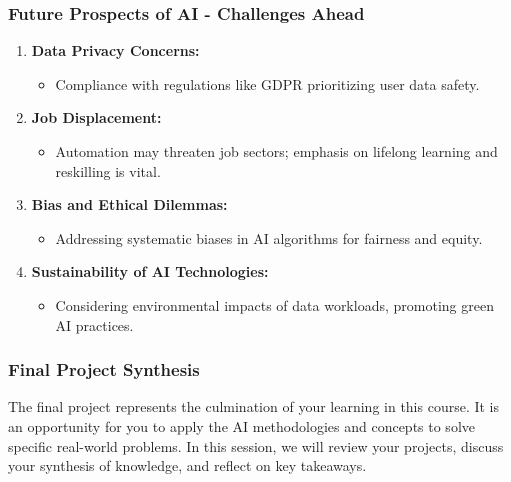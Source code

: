 \documentclass[aspectratio=169]{beamer}
\begin{document}
\begin{frame}[fragile]
    \frametitle{Future Prospects of AI - Challenges Ahead}
    \begin{enumerate}
        \item \textbf{Data Privacy Concerns:}
            \begin{itemize}
                \item Compliance with regulations like GDPR prioritizing user data safety.
            \end{itemize}
        \item \textbf{Job Displacement:}
            \begin{itemize}
                \item Automation may threaten job sectors; emphasis on lifelong learning and reskilling is vital.
            \end{itemize}
        \item \textbf{Bias and Ethical Dilemmas:}
            \begin{itemize}
                \item Addressing systematic biases in AI algorithms for fairness and equity.
            \end{itemize}
        \item \textbf{Sustainability of AI Technologies:}
            \begin{itemize}
                \item Considering environmental impacts of data workloads, promoting green AI practices.
            \end{itemize}
    \end{enumerate}
\end{frame}

\begin{frame}[fragile]
    \frametitle{Final Project Synthesis}
    The final project represents the culmination of your learning in this course. 
    It is an opportunity for you to apply the AI methodologies and concepts to solve specific real-world problems. 
    In this session, we will review your projects, discuss your synthesis of knowledge, and reflect on key takeaways.
\end{frame}
\end{document}
